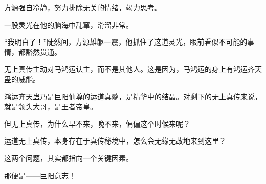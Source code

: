 \begin{this_body}
方源强自冷静，努力排除无关的情绪，竭力思考。

一股灵光在他的脑海中乱窜，滑溜非常。

“我明白了！”陡然间，方源雄躯一震，他抓住了这道灵光，眼前看似不可能的事情，都豁然贯通。

无上真传主动对马鸿运认主，而不是其他人。这是因为，马鸿运的身上有鸿运齐天蛊的威能。

鸿运齐天蛊乃是巨阳仙尊的运道真髓，是精华中的结晶。对剩下的无上真传来说，就是领头大哥，是王者帝皇。

但无上真传，为什么早不来，晚不来，偏偏这个时候来呢？

运道无上真传，本身存在于真传秘境中，怎么会无缘无故地来到这里？

这两个问题，其实都指向一个关键因素。

那便是——巨阳意志！

\end{this_body}


